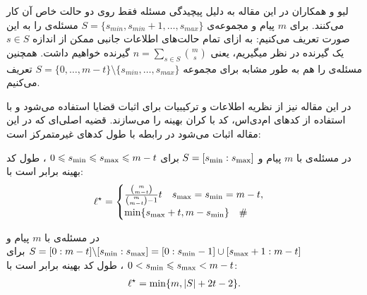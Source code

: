 لیو و همکاران در این مقاله به دلیل پیچیدگی مسئله فقط روی دو حالت خاص آن کار می‌کنند. برای 
$m$
پیام و مجموعه‌ی
$S = \{s_{min}, s_{min }+ 1, \ldots, s_{max}\}$
مسئله‌ی 
را به این صورت تعریف می‌کنیم: به ازای تمام حالت‌های اطلاعات جانبی ممکن از اندازه
$s \in S$
یک گیرنده در نظر میگیریم، یعنی
$n = \sum\limits_{s \in S} \binom{m}{s}$
گیرنده خواهیم داشت. همچنین مسئله‌ی
را هم به طور مشابه برای مجموعه
$S = \{0, \ldots, m - t\} \setminus \{s_{min}, \ldots, s_{max}\}$
تعریف می‌کنیم.

در این مقاله نیز از نظریه اطلاعات و ترکیبیات برای اثبات قضایا استفاده می‌شود و با استفاده از کدهای ام‌دی‌اس، کد با کران بهینه را می‌سازند. قضیه اصلی‌ای که در این مقاله اثبات می‌شود در رابطه با طول کدهای غیرمتمرکز است:
\begin{theorem}[consecutive]
	\label{thm:consecutive_s}
	در مسئله‌ی
	با
	$m$ 
	پیام و
	  $S=[s_{\rm min}:s_{\rm max}]$
	  برای
	  $0\leqslant s_{\rm min} \leqslant s_{\rm max} \leqslant m-t$
	  ، طول کد بهینه برابر است با:
	\begin{align}
		\ell^{\star}=\begin{cases}
			\frac{\binom{m}{m-t}}{\binom{m}{m-t}-1}  t \quad s_{\rm max}=s_{\rm min}=m-t,\\
			\min\{s_{\rm max}+t, m-s_{\rm min}\} \quad \#
		\end{cases}
		\label{eq:thm:consecutive_s}
	\end{align}
\end{theorem}


\begin{theorem}[complement-consecutive]
	\label{thm:complement_consecutive_s}
	در مسئله‌ی
با
 $m$ 
 پیام
 و
 $S=[0:m-t]\backslash [s_{\rm min}:s_{\rm max}] = [0:s_{\rm min}-1]\cup[s_{\rm max}+1:m-t]$
 برای
 $0 < s_{\rm min} \leqslant s_{\rm max} < m-t$
 ، طول کد بهینه برابر است با:
	\begin{align}
		\ell^{\star}=\min\{m,|S|+2t-2\}.
		\label{eq:thm:complement_consecutive_s}
	\end{align}
\end{theorem}

